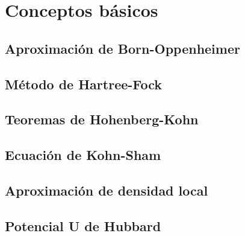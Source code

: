 \documentclass[xcolor=dvipsnames]{beamer}
\begin{document}

\section{Conceptos b\'asicos}


\subsection{Aproximaci\'on de Born-Oppenheimer}



\subsection{M\'etodo de Hartree-Fock}



\subsection{Teoremas de Hohenberg-Kohn}



\subsection{Ecuaci\'on de Kohn-Sham}



\subsection{Aproximaci\'on de densidad local}


\subsection{Potencial U de Hubbard}

\end{document}
